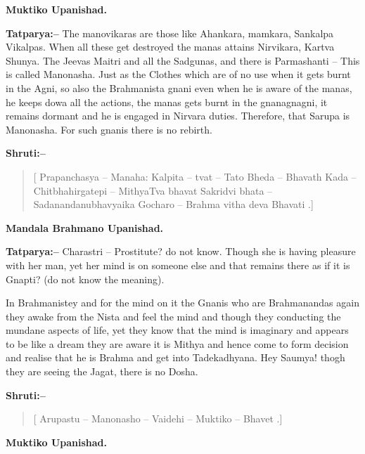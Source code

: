 \begin{flushright}
\textbf{Muktiko Upanishad.}
\end{flushright}

\textbf{Tatparya:–} The manovikaras are those like Ahankara, mamkara, Sankalpa Vikalpas. When all these get destroyed the manas attains Nirvikara, Kartva Shunya. The Jeevas Maitri and all the Sadgunas, and there is Parmashanti – This is called Manonasha. Just as the Clothes which are of no use when it gets burnt in the Agni, so also the Brahmanista gnani even when he is aware of the manas, he keeps dowa all the actions, the manas gets burnt in the gnanagnagni, it remains dormant and he is engaged in Nirvara duties. Therefore, that Sarupa is Manonasha. For such gnanis there is no rebirth.

\textbf{Shruti:–}

\begin{verse}
[ Prapanchasya – Manaha: Kalpita – tvat – Tato Bheda – Bhavath  Kada – Chitbhahirgatepi – MithyaTva bhavat Sakridvi bhata – Sadanandanubhavyaika Gocharo – Brahma vitha deva Bhavati .]
\end{verse}

\begin{flushright}
\textbf{Mandala Brahmano Upanishad.}
\end{flushright}

\textbf{Tatparya:–} Charastri – Prostitute? do not know. Though she is having pleasure with her man, yet her mind is on someone else and that remains there as if it is Gnapti? (do not know the meaning).

In Brahmanistey and for the mind on it the Gnanis who are Brahmanandas again they awake from the Nista and feel the mind and though they conducting the mundane aspects of life, yet they know that the mind is imaginary and appears to be like a dream they are aware it is Mithya and hence come to form decision and realise that he is Brahma and get into Tadekadhyana. Hey Saumya! thogh they are seeing the Jagat, there is no Dosha.

\textbf{Shruti:–}

\begin{verse}
[ Arupastu – Manonasho – Vaidehi – Muktiko – Bhavet .]
\end{verse}

\begin{flushright}
\textbf{Muktiko Upanishad.}
\end{flushright}

